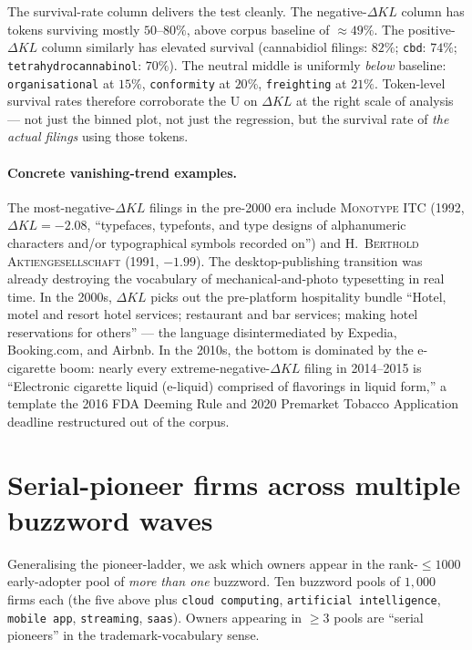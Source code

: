 \documentclass[11pt]{article}
\begin{document}
The survival-rate column delivers the test cleanly. The
negative-$\Delta KL$ column has tokens surviving mostly $50$--$80\%$,
above corpus baseline of $\approx 49\%$. The positive-$\Delta KL$
column similarly has elevated survival (cannabidiol filings: $82\%$;
\texttt{cbd}: $74\%$; \texttt{tetrahydrocannabinol}: $70\%$). The
neutral middle is uniformly \emph{below} baseline:
\texttt{organisational} at $15\%$, \texttt{conformity} at $20\%$,
\texttt{freighting} at $21\%$. Token-level survival rates therefore
corroborate the U on $\Delta KL$ at the right scale of analysis ---
not just the binned plot, not just the regression, but the survival
rate of \emph{the actual filings} using those tokens.

\paragraph{Concrete vanishing-trend examples.} The
most-negative-$\Delta KL$ filings in the pre-2000 era include
\textsc{Monotype ITC} (1992, $\Delta KL = -2.08$, ``typefaces,
typefonts, and type designs of alphanumeric characters and/or
typographical symbols recorded on'') and \textsc{H.\ Berthold
Aktiengesellschaft} (1991, $-1.99$). The desktop-publishing transition
was already destroying the vocabulary of mechanical-and-photo
typesetting in real time. In the 2000s, $\Delta KL$ picks out the
pre-platform hospitality bundle ``Hotel, motel and resort hotel
services; restaurant and bar services; making hotel reservations for
others'' --- the language disintermediated by Expedia, Booking.com,
and Airbnb. In the 2010s, the bottom is dominated by the e-cigarette
boom: nearly every extreme-negative-$\Delta KL$ filing in
2014--2015 is ``Electronic cigarette liquid (e-liquid) comprised of
flavorings in liquid form,'' a template the 2016 FDA Deeming Rule and
2020 Premarket Tobacco Application deadline restructured out of the
corpus.

\section{Serial-pioneer firms across multiple buzzword waves}
\label{sec:cross-wave}

Generalising the pioneer-ladder, we ask which owners appear in the
rank-$\leq 1000$ early-adopter pool of \emph{more than one} buzzword.
Ten buzzword pools of $1{,}000$ firms each (the five above plus
\texttt{cloud computing}, \texttt{artificial intelligence},
\texttt{mobile app}, \texttt{streaming}, \texttt{saas}). Owners
appearing in $\geq 3$ pools are ``serial pioneers'' in the
trademark-vocabulary sense.
\end{document}
